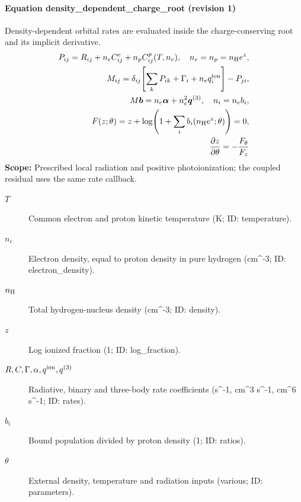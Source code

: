 
\paragraph{Equation density\_dependent\_charge\_root (revision 1)}
Density-dependent orbital rates are evaluated inside the charge-conserving root and its implicit derivative.
\begin{equation}
\begin{aligned}
P_{ij}=R_{ij}+n_e C^{e}_{ij}+n_p C^{p}_{ij}(T,n_e),\quad n_e=n_p=n_{\rm H}e^z,\\
M_{ij}=\delta_{ij}\!\left[\sum_kP_{ik}+\Gamma_i+n_eq_i^{\rm ion}\right]-P_{ji},\\
M\boldsymbol b=n_e\boldsymbol\alpha+n_e^2\boldsymbol q^{(3)},\quad n_i=n_e b_i,\\
F(z;\theta)=z+\log\!\left(1+\sum_i b_i(n_{\rm H}e^z;\theta)\right)=0,\\
\frac{\partial z}{\partial\theta}=-\frac{F_\theta}{F_z}
\end{aligned}
\label{eq:escape.cloudy_5f_investigation:density_5f_dependent_5f_charge_5f_root:1}
\end{equation}
\noindent\textbf{Scope:} Prescribed local radiation and positive photoionization; the coupled residual uses the same rate callback.

\begin{description}
\item[$T$] Common electron and proton kinetic temperature (K; ID: temperature).
\item[$n_e$] Electron density, equal to proton density in pure hydrogen (cm\textasciicircum{}-3; ID: electron\_density).
\item[$n_{\rm H}$] Total hydrogen-nucleus density (cm\textasciicircum{}-3; ID: density).
\item[$z$] Log ionized fraction (1; ID: log\_fraction).
\item[$R,C,\Gamma,\alpha,q^{\rm ion},q^{(3)}$] Radiative, binary and three-body rate coefficients (s\textasciicircum{}-1, cm\textasciicircum{}3 s\textasciicircum{}-1, cm\textasciicircum{}6 s\textasciicircum{}-1; ID: rates).
\item[$b_i$] Bound population divided by proton density (1; ID: ratios).
\item[$\theta$] External density, temperature and radiation inputs (various; ID: parameters).
\end{description}

